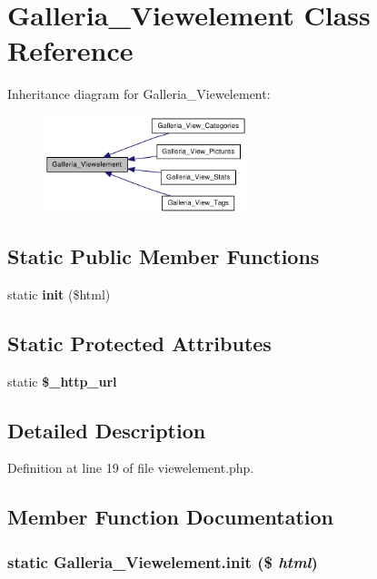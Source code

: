 \section{Galleria\_\-Viewelement Class Reference}
\label{classGalleria__Viewelement}
Inheritance diagram for Galleria\_\-Viewelement:\nopagebreak
\begin{figure}[H]
\begin{center}
\leavevmode
\includegraphics[width=168pt]{classGalleria__Viewelement__inherit__graph}
\end{center}
\end{figure}
\subsection*{Static Public Member Functions}
\begin{CompactItemize}
\item 
static {\bf init} (\$html)
\end{CompactItemize}
\subsection*{Static Protected Attributes}
\begin{CompactItemize}
\item 
static {\bf \$\_\-http\_\-url}
\end{CompactItemize}


\subsection{Detailed Description}


Definition at line 19 of file viewelement.php.

\subsection{Member Function Documentation}
\subsubsection{\setlength{\rightskip}{0pt plus 5cm}static Galleria\_\-Viewelement.init (\$ {\em html})\hspace{0.3cm}{\tt  [static]}}\label{classGalleria__Viewelement_d666f598e11c3d1bfb963b927951cbbb}


